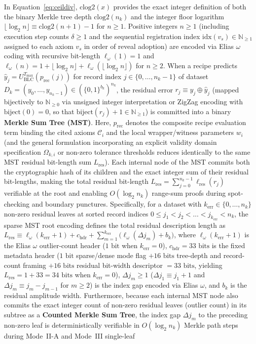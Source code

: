 \documentclass[runningheads,a4paper]{llncs}
\renewcommand{\_}{\textunderscore\allowbreak}
\begin{document}
In Equation~\eqref{eq:ceildiv}, $\text{clog2}(x)$ provides the exact integer definition of both the binary Merkle tree depth $\text{clog2}(n_k)$ and the integer floor logarithm $\lfloor \log_2 n \rfloor \equiv \text{clog2}(n + 1) - 1$ for $n \ge 1$. Positive integers $n \ge 1$ (including execution step counts $\delta \ge 1$ and the sequential registration index $\text{idx}(v_s) \in \mathbb{N}_{\ge 1}$ assigned to each axiom $v_s$ in order of reveal adoption) are encoded via Elias $\omega$ coding \cite{elias1975} with recursive bit-length $\ell_\omega(1) = 1$ and $\ell_\omega(n) = 1 + \lfloor \log_2 n \rfloor + \ell_\omega(\lfloor \log_2 n \rfloor)$ for $n \ge 2$. When a recipe predicts $\hat{y}_j = U_{\text{BLC}}^{T_{\max}}(p_{\text{rec}}(j))$ for record index $j \in \{0,\allowbreak \dots,\allowbreak n_k - 1\}$ of dataset $D_k = (y_0,\allowbreak \dots,\allowbreak y_{n_k - 1}) \in (\{0,1\}^{b_k})^{n_k}$, the residual error $r_j \equiv y_j \oplus \hat{y}_j$ (mapped bijectively to $\mathbb{N}_{\ge 0}$ via unsigned integer interpretation or ZigZag encoding with $\text{biject}(0) = 0$, so that $\text{biject}(r_j) + 1 \in \mathbb{N}_{\ge 1}$) is committed into a binary \textbf{Merkle Sum Tree (MST)}. Here, $p_{\text{rec}}$ denotes the composite recipe evaluation term binding the cited axioms $\mathcal{C}_i$ and the local wrapper/witness parameters $w_i$ (and the general formulation incorporating an explicit validity domain specification $\Omega_{k,i}$ or non-zero tolerance thresholds reduces identically to the same MST residual bit-length sum $L_{\text{res}}$). Each internal node of the MST commits both the cryptographic hash of its children and the exact integer sum of their residual bit-lengths, making the total residual bit-length $L_{\text{res}} = \sum_{j=0}^{n_k-1} \ell_{\text{res}}(r_j)$ verifiable at the root and enabling $O(\log_2 n_k)$ range-sum proofs during spot-checking and boundary punctures. Specifically, for a dataset with $k_{\text{err}} \in \{0,\allowbreak \dots,\allowbreak n_k\}$ non-zero residual leaves at sorted record indices $0 \le j_1 < j_2 < \dots < j_{k_{\text{err}}} < n_k$, the sparse MST root encoding defines the total residual description length as $L_{\text{res}} \equiv \ell_\omega(k_{\text{err}} + 1) + c_{\text{hdr}} + \sum_{m=1}^{k_{\text{err}}} \big(\ell_\omega(\Delta j_m) + b_k\big)$, where $\ell_\omega(k_{\text{err}} + 1)$ is the Elias $\omega$ outlier-count header ($1\text{ bit}$ when $k_{\text{err}} = 0$), $c_{\text{hdr}} = 33\text{ bits}$ is the fixed metadata header ($1\text{ bit}$ sparse/dense mode flag $+ 16\text{ bits}$ tree-depth and record-count framing $+ 16\text{ bits}$ residual bit-width descriptor $= 33\text{ bits}$, yielding $L_{\text{res}} = 1 + 33 = 34\text{ bits}$ when $k_{\text{err}} = 0$), $\Delta j_m \ge 1$ ($\Delta j_1 \equiv j_1 + 1$ and $\Delta j_m \equiv j_m - j_{m-1}$ for $m \ge 2$) is the index gap encoded via Elias $\omega$, and $b_k$ is the residual amplitude width. Furthermore, because each internal MST node also commits the exact integer count of non-zero residual leaves (outlier count) in its subtree as a \textbf{Counted Merkle Sum Tree}, the index gap $\Delta j_m$ to the preceding non-zero leaf is deterministically verifiable in $O(\log_2 n_k)$ Merkle path steps during Mode~II-A and Mode~III single-leaf 
\end{document}
